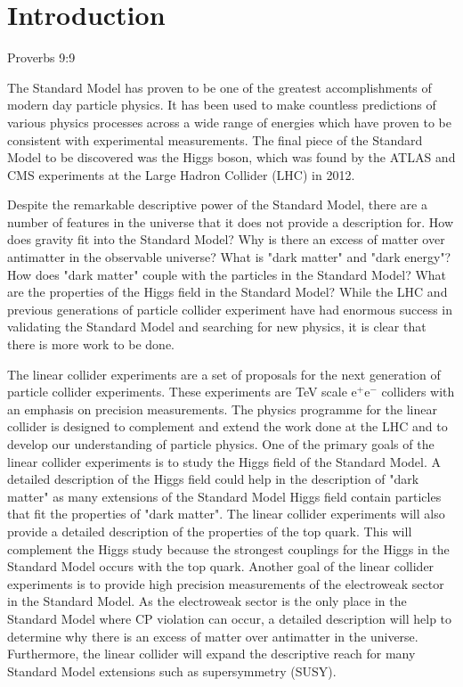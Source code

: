 \chapter{Introduction}
\label{chap:introduction}

{Proverbs 9:9}


The Standard Model has proven to be one of the greatest accomplishments of modern day particle physics.  It has been used to make countless predictions of various physics processes across a wide range of energies which have proven to be consistent with experimental measurements.  The final piece of the Standard Model to be discovered was the Higgs boson, which was found by the ATLAS \cite{Aad:2012tfa} and CMS \cite{Chatrchyan:2012xdj} experiments at the Large Hadron Collider (LHC) in 2012.  

Despite the remarkable descriptive power of the Standard Model, there are a number of features in the universe that it does not provide a description for.  How does gravity fit into the Standard Model?  Why is there an excess of matter over antimatter in the observable universe?  What is "dark matter" and "dark energy"?  How does "dark matter" couple with the particles in the Standard Model?  What are the properties of the Higgs field in the Standard Model?  While the LHC and previous generations of particle collider experiment have had enormous success in validating the Standard Model and searching for new physics, it is clear that there is more work to be done. 

The linear collider experiments are a set of proposals for the next generation of particle collider experiments.  These experiments are TeV scale $\text{e}^{+}\text{e}^{-}$ colliders with an emphasis on precision measurements.  The physics programme for the linear collider is designed to complement and extend the work done at the LHC and to develop our understanding of particle physics.  One of the primary goals of the linear collider experiments is to study the Higgs field of the Standard Model.  A detailed description of the Higgs field could help in the description of "dark matter" as many extensions of the Standard Model Higgs field contain particles that fit the properties of "dark matter".  The linear collider experiments will also provide a detailed description of the properties of the top quark.  This will complement the Higgs study because the strongest couplings for the Higgs in the Standard Model occurs with the top quark.  Another goal of the linear collider experiments is to provide high precision measurements of the electroweak sector in the Standard Model.  As the electroweak sector is the only place in the Standard Model where CP violation can occur, a detailed description will help to determine why there is an excess of matter over antimatter in the universe.  Furthermore, the linear collider will expand the descriptive reach for many Standard Model extensions such as supersymmetry (SUSY).

